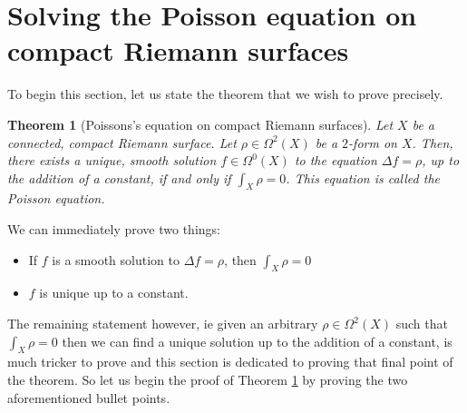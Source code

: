 \documentclass[11pt]{report}
\newtheorem{thm}{Theorem}[section]
\theoremstyle{definition}
\begin{document}
\section{Solving the Poisson equation on compact Riemann surfaces}
To begin this section, let us state the theorem that we wish to prove precisely.
\begin{thm}[Poissons's equation on compact Riemann surfaces]\label{compactPoisson}
  Let $X$ be a connected, compact Riemann surface. Let $\rho \in \Omega^2(X)$ be a $2$-form on $X$. Then, there exists a unique, smooth solution $f \in \Omega^0(X)$ to the equation $\Delta f = \rho$, up to the addition of a constant, if and only if $\int_X \rho = 0$. This equation is called the Poisson equation.
\end{thm}
We can immediately prove two things:
\begin{itemize}
  \item If $f$ is a smooth solution to $\Delta f = \rho$, then $\int_X \rho= 0$
  \item $f$ is unique up to a constant.
\end{itemize}
The remaining statement however, ie given an arbitrary $\rho \in \Omega^2(X)$ such that $\int_X \rho = 0$ then we can find a unique solution up to the addition of a constant, is much tricker to prove and this section is dedicated to proving that final point of the theorem. So let us begin the proof of Theorem \ref{compactPoisson} by proving the two aforementioned bullet points.
\end{document}
